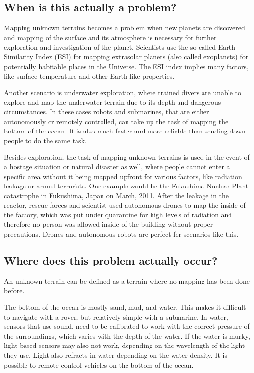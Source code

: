 \subsection{When is this actually a problem?}
Mapping unknown terrains becomes a problem when new planets are discovered and mapping of the surface and its atmosphere is necessary for further exploration and investigation of the planet. Scientists use the so-called Earth Similarity Index (ESI) for mapping extrasolar planets (also called exoplanets) for potentially habitable places in the Universe\cite{exoplanets}\cite{esi}. The ESI index implies many factors, like surface temperature and other Earth-like properties. 

Another scenario is underwater exploration, where trained divers are unable to explore and map the underwater terrain due to its depth and dangerous circumstances. In these cases robots and submarines, that are either autonomously or remotely controlled, can take up the task of mapping the bottom of the ocean. It is also much faster and more reliable than sending down people to do the same task.

Besides exploration, the task of mapping unknown terrains is used in the event of a hostage situation or natural disaster as well, where people cannot enter a specific area without it being mapped upfront for various factors, like radiation leakage or armed terrorists. One example would be the Fukushima Nuclear Plant catastrophe in Fukushima, Japan on March, 2011. After the leakage in the reactor, rescue forces and scientist used autonomous drones to map the inside of the factory\cite{fukushima}, which was put under quarantine for high levels of radiation and therefore no person was allowed inside of the building without proper precautions. Drones and autonomous robots are perfect for scenarios like this.

\clearpage

\subsection{Where does this problem actually occur?}
An unknown terrain can be defined as a terrain where no mapping has been done before.

The bottom of the ocean is mostly sand, mud, and water\cite{bottom-composition}. This makes it difficult to navigate with a rover, but relatively simple with a submarine. In water, sensors that use sound, need to be calibrated to work with the correct pressure of the surroundings, which varies with the depth of the water. If the water is murky, light-based sensors may also not work, depending on the wavelength of the light they use. Light also refracts in water depending on the water density. It is possible to remote-control vehicles on the bottom of the ocean. %

